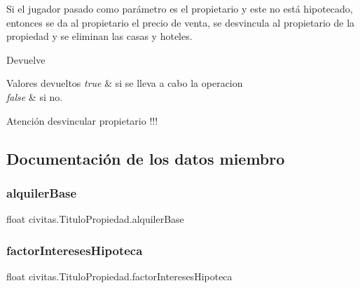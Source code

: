 Si el jugador pasado como parámetro es el propietario y este no está hipotecado, entonces se da al propietario el precio de venta, se desvincula al propietario de la propiedad y se eliminan las casas y hoteles. \begin{DoxyReturn}{Devuelve}

\end{DoxyReturn}

\begin{DoxyRetVals}{Valores devueltos}
{\em true} & si se lleva a cabo la operacion \\
\hline
{\em false} & si no. \\
\hline
\end{DoxyRetVals}
\begin{DoxyWarning}{Atención}
desvincular propietario !!! 
\end{DoxyWarning}


\subsection{Documentación de los datos miembro}
\mbox{\label{classcivitas_1_1TituloPropiedad_ad372303cdfec1ef367ce5173b4cf190f}} 
\subsubsection{\texorpdfstring{alquiler\+Base}{alquilerBase}}
{\footnotesize\ttfamily float civitas.\+Titulo\+Propiedad.\+alquiler\+Base\hspace{0.3cm}{\ttfamily [private]}}

\mbox{\label{classcivitas_1_1TituloPropiedad_abd6ce22a95527549a5d16c8d7b9fe7c4}} 
\subsubsection{\texorpdfstring{factor\+Intereses\+Hipoteca}{factorInteresesHipoteca}}
{\footnotesize\ttfamily float civitas.\+Titulo\+Propiedad.\+factor\+Intereses\+Hipoteca\hspace{0.3cm}{\ttfamily [private]}}

